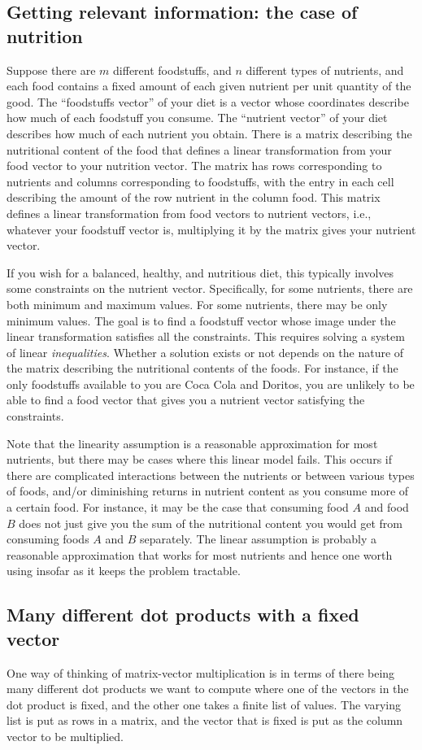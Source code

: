 \documentclass[10pt]{amsart}
\begin{document}
\subsection{Getting relevant information: the case of nutrition}

Suppose there are $m$ different foodstuffs, and $n$ different types of
nutrients, and each food contains a fixed amount of each given
nutrient per unit quantity of the good. The ``foodstuffs vector'' of
your diet is a vector whose coordinates describe how much of each
foodstuff you consume. The ``nutrient vector'' of your diet describes
how much of each nutrient you obtain. There is a matrix describing the
nutritional content of the food that defines a linear transformation
from your food vector to your nutrition vector. The matrix has rows
corresponding to nutrients and columns corresponding to foodstuffs,
with the entry in each cell describing the amount of the row nutrient
in the column food. This matrix defines a linear transformation from
food vectors to nutrient vectors, i.e., whatever your foodstuff vector
is, multiplying it by the matrix gives your nutrient vector.

If you wish for a balanced, healthy, and nutritious diet, this
typically involves some constraints on the nutrient
vector. Specifically, for some nutrients, there are both minimum and
maximum values. For some nutrients, there may be only minimum
values. The goal is to find a foodstuff vector whose image under the
linear transformation satisfies all the constraints. This requires
solving a system of linear {\em inequalities}. Whether a solution
exists or not depends on the nature of the matrix describing the
nutritional contents of the foods. For instance, if the only
foodstuffs available to you are Coca Cola and Doritos, you are
unlikely to be able to find a food vector that gives you a nutrient
vector satisfying the constraints.

Note that the linearity assumption is a reasonable approximation for
most nutrients, but there may be cases where this linear model
fails. This occurs if there are complicated interactions between the
nutrients or between various types of foods, and/or diminishing
returns in nutrient content as you consume more of a certain food. For
instance, it may be the case that consuming food $A$ and food $B$ does
not just give you the sum of the nutritional content you would get
from consuming foods $A$ and $B$ separately. The linear assumption is
probably a reasonable approximation that works for most nutrients and
hence one worth using insofar as it keeps the problem tractable.

\subsection{Many different dot products with a fixed vector}

One way of thinking of matrix-vector multiplication is in terms of
there being many different dot products we want to compute where one
of the vectors in the dot product is fixed, and the other one takes a
finite list of values. The varying list is put as rows in a matrix,
and the vector that is fixed is put as the column vector to be
multiplied.
\end{document}

